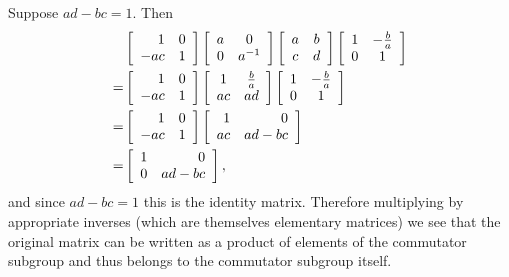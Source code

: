 \documentclass{article}
\begin{document}
\begin{Answer}
\begin{enumerate}[(a)]
{      Suppose $ad - bc = 1$. Then
      \begin{align*}
       &\left[\begin{array}{r r}
          1   & 0 \\
          -ac & 1
        \end{array}\right]
        \left[\begin{array}{c c}
          a & 0     \\
          0 & a^{-1}
        \end{array}\right]
        \left[\begin{array}{c c}
          a & b \\ c & d
        \end{array}\right]        
        \left[\begin{array}{c c}
          1 & -\frac{b}{a} \\
          0 & 1
        \end{array}\right] \\
      =&
        \left[\begin{array}{r r}
          1   & 0 \\
          -ac & 1
        \end{array}\right]
        \left[\begin{array}{c c}
          1 & \frac{b}{a} \\ ac & ad
        \end{array}\right]
        \left[\begin{array}{c c}
          1 & -\frac{b}{a} \\
          0 & 1
        \end{array}\right] \\
      =&\left[\begin{array}{r r}
          1   & 0 \\
          -ac & 1
        \end{array}\right]
        \left[\begin{array}{r r}
          1 & 0 \\ ac & ad - bc
        \end{array}\right] \\
      =&
        \left[\begin{array}{r r}
          1 & 0 \\ 0 & ad - bc
        \end{array}\right],
      \end{align*}
      and since $ad - bc = 1$ this is the identity matrix. Therefore
      multiplying by appropriate inverses (which are themselves
      elementary matrices) we see that the original matrix can be
      written as a product of elements of the commutator subgroup and
      thus belongs to the commutator subgroup itself.

}
\end{enumerate}
\end{Answer}
\end{document}
